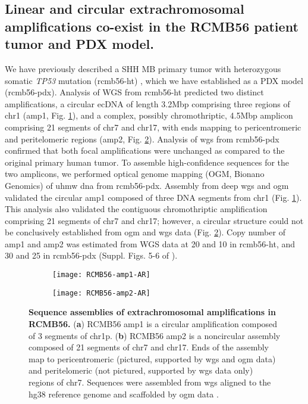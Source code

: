 \subsection{Linear and circular extrachromosomal amplifications co-exist in the RCMB56 patient tumor and PDX model.}
We have previously described a SHH MB primary tumor with heterozygous somatic \textit{TP53} mutation (\acrshort{rcmb56-ht}) \cite{rusert_2020}, which we have established as a PDX model (\acrshort{rcmb56-pdx}). Analysis of WGS from \acrshort{rcmb56-ht} predicted two distinct amplifications, a circular ecDNA of length 3.2Mbp comprising three regions of chr1 (amp1, Fig. \ref{subfig:rcmb56-ar-1}), and a complex, possibly chromothriptic, 4.5Mbp amplicon comprising 21 segments of chr7 and chr17, with ends mapping to pericentromeric and peritelomeric regions (amp2, Fig. \ref{subfig:rcmb56-ar-2}). Analysis of \gls{wgs} from \acrshort{rcmb56-pdx} confirmed that both focal amplifications were unchanged as compared to the original primary human tumor. To assemble high-confidence sequences for the two amplicons, we performed optical genome mapping (OGM, Bionano Genomics) of \gls{uhmw dna} from \acrshort{rcmb56-pdx}. Assembly from deep \gls{wgs} and \gls{ogm} validated the circular amp1 composed of three DNA segments from chr1 (Fig. \ref{subfig:rcmb56-ar-1}). This analysis also validated the contiguous chromothriptic amplification comprising 21 segments of chr7 and chr17; however, a circular structure could not be conclusively established from \gls{ogm} and \gls{wgs} data (Fig. \ref{subfig:rcmb56-ar-2}). Copy number of amp1 and amp2 was estimated from WGS data at 20 and 10 in \acrshort{rcmb56-ht}, and 30 and 25 in \acrshort{rcmb56-pdx} (Suppl. Figs. 5-6 of \cite{Chapman}). 

\begin{figure}[!h]
    \centering
    \begin{subfigure}{0.49\textwidth}
        \centering
        \texttt{[image: RCMB56-amp1-AR]}
        \caption{}
        \label{subfig:rcmb56-ar-1}
    \end{subfigure}
    \begin{subfigure}{0.49\textwidth}
        \texttt{[image: RCMB56-amp2-AR]}
        \caption{}
        \label{subfig:rcmb56-ar-2}
    \end{subfigure}
    \caption[Sequence assemblies of extrachromosomal amplifications in RCMB56.]{\textbf{Sequence assemblies of extrachromosomal amplifications in RCMB56.} (\textbf{a}) RCMB56 amp1 is a circular amplification composed of 3 segments of chr1p. (\textbf{b}) RCMB56 amp2 is a noncircular assembly composed of 21 segments of chr7 and chr17. Ends of the assembly map to pericentromeric (pictured, supported by \gls{wgs} and \gls{ogm} data) and peritelomeric (not pictured, supported by \gls{wgs} data only) regions of chr7. Sequences were assembled from \gls{wgs} aligned to the hg38 reference genome and scaffolded by \gls{ogm} data \cite{Kim_2020}.}
    \label{fig:rcmb56-ar}
\end{figure}

